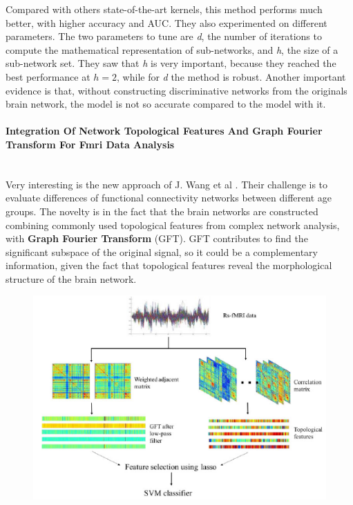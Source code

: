 Compared with others state-of-the-art kernels, this method performs much better, with higher accuracy and AUC. They also experimented on different parameters. The two parameters to tune are \textit{d}, the number of iterations to compute the mathematical representation of sub-networks, and \textit{h}, the size of a sub-network set. They saw that \textit{h} is very important, because they reached the best performance at $ h = 2 $, while for \textit{d} the method is robust. 
Another important evidence is that, without constructing discriminative networks from the originals brain network, the model is not so accurate compared to the model with it. 

\paragraph{Integration Of Network Topological Features And Graph Fourier Transform For Fmri Data Analysis}\
\\

Very interesting is the new approach of J. Wang et al \cite{8363530}. Their challenge is to evaluate differences of functional connectivity networks between different age groups. The novelty is in the fact that the brain networks are constructed combining commonly used topological features from complex network analysis, with \textbf{Graph Fourier Transform} (GFT). GFT contributes to find the significant subspace of the original signal, so it could be a complementary information, given the fact that topological features reveal the morphological structure of the brain network. 

\begin{figure}[htbp]
	\centering
	\includegraphics[scale=0.8]{Immagini/integration.PNG}
	\caption{\label{fig:diagram16}}
\end{figure}

